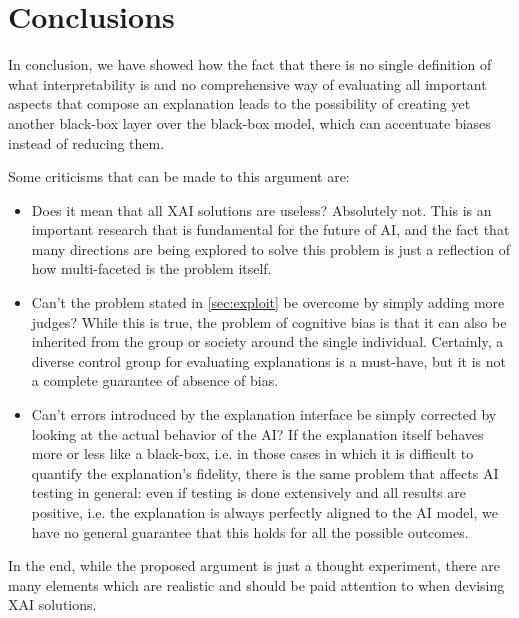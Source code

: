 \documentclass[conference]{IEEEtran}
\begin{document}
\section{Conclusions}
\label{sec:conclusions}


In conclusion, we have showed how the fact that there is no single definition of what interpretability is and no comprehensive way of evaluating all important aspects that compose an explanation leads to the possibility of creating yet another black-box layer over the black-box model, which can accentuate biases instead of reducing them.

Some criticisms that can be made to this argument are:

\begin{itemize}
    \item Does it mean that all XAI solutions are useless? Absolutely not. This is an important research that is fundamental for the future of AI, and the fact that many directions are being explored to solve this problem is just a reflection of how multi-faceted is the problem itself.
    \item Can't the problem stated in \ref{sec:exploit} be overcome by simply adding more judges? While this is true, the problem of cognitive bias is that it can also be inherited from the group or society around the single individual. Certainly, a diverse control group for evaluating explanations is a must-have, but it is not a complete guarantee of absence of bias.
    \item Can't errors introduced by the explanation interface be simply corrected by looking at the actual behavior of the AI? If the explanation itself behaves more or less like a black-box, i.e. in those cases in which it is difficult to quantify the explanation's fidelity, there is the same problem that affects AI testing in general: even if testing is done extensively and all results are positive, i.e. the explanation is always perfectly aligned to the AI model, we have no general guarantee that this holds for all the possible outcomes.
\end{itemize}

In the end, while the proposed argument is just a thought experiment, there are many elements which are realistic and should be paid attention to when devising XAI solutions.



\end{document}
